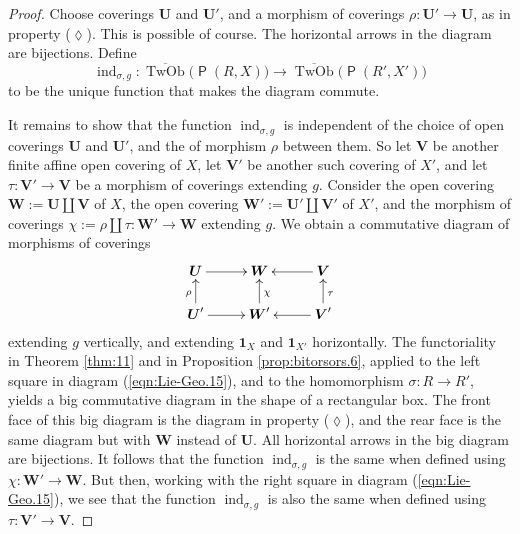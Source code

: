 \documentclass[a4paper, 10pt]{amsart}
\theoremstyle{definition}
\numberwithin{equation}{section}
\newcommand{\opn}{\operatorname}
\newcommand{\cat}[1]{\operatorname{\mathsf{#1}}}
\newcommand{\ol}{\overline}
\newcommand{\bsym}[1]{\boldsymbol{#1}}
\newcommand{\si}{\sigma}
\newcommand{\twocat}[1]{\operatorname{\bsym{\cat{#1}}}}
\begin{document}
\begin{proof}
Choose coverings  $\bsym{U}$ and $\bsym{U}'$, and a morphism of
coverings
$\rho : \bsym{U}' \to \bsym{U}$, 
as in property ($\lozenge$). This is possible of course. 
The horizontal arrows in the diagram are bijections.
Define 
\[ \opn{ind}_{\si, g} :
\ol{\opn{TwOb}} \bigl( \twocat{P}(R, X) \bigr) \to 
\ol{\opn{TwOb}} \bigl( \twocat{P}(R', X') \bigr) \]
to be the unique function that makes the diagram commute.

It remains to show that the function
$\opn{ind}_{\si, g}$ is independent of
the choice of open coverings $\bsym{U}$ and $\bsym{U}'$, and the of morphism 
$\rho$ between them. So let $\bsym{V}$ be another finite affine
open covering of $X$, let $\bsym{V}'$ be another such covering of $X'$, and let
$\tau : \bsym{V}' \to \bsym{V}$
be a morphism of coverings extending $g$.
Consider the open covering 
$\bsym{W} := \bsym{U} \coprod \bsym{V}$ of $X$, the open covering 
$\bsym{W}' := \bsym{U}' \coprod \bsym{V}'$ of $X'$,
and the morphism of coverings 
$\chi := \rho \amalg \tau : \bsym{W}' \to \bsym{W}$
extending $g$. We obtain a commutative diagram of morphisms of coverings
\begin{equation} \label{eqn:Lie-Geo.15}
\UseTips \xymatrix @C=6ex @R=4ex {
\bsym{U}
\ar[r]
&
\bsym{W}
&
\bsym{V}
\ar[l]
\\
\bsym{U}'
\ar[u]^{\rho}
\ar[r]
& 
\bsym{W}' 
\ar[u]_{\chi}
&
\bsym{V}'
\ar[l]
\ar[u]_{\tau}
}
\end{equation}
extending $g$ vertically, and extending $\bsym{1}_X$ and  $\bsym{1}_{X'}$
horizontally.  
The functoriality in Theorem \ref{thm:11} and in Proposition
\ref{prop:bitorsors.6}, applied to the left square in diagram
(\ref{eqn:Lie-Geo.15}), and to the homomorphism $\si : R \to R'$,
yields a big commutative diagram in the shape of a rectangular box. 
The front face of this big diagram is the diagram in property ($\lozenge$),
and the rear face is the same diagram but with $\bsym{W}$ instead of
$\bsym{U}$. All horizontal arrows in the big diagram are bijections. 
It follows that the function $\opn{ind}_{\si, g}$ is the same when defined
using $\chi : \bsym{W}' \to \bsym{W}$.
But then, working with the right square in diagram (\ref{eqn:Lie-Geo.15}),
we see that the function $\opn{ind}_{\si, g}$ is also the same when defined
using $\tau : \bsym{V}' \to \bsym{V}$.
\end{proof}
\end{document}
